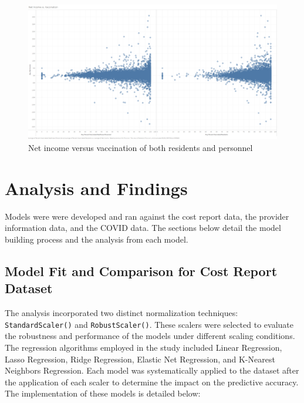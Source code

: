 \documentclass{article}
\theoremstyle{mytheoremstyle}
\theoremstyle{mytheoremstyle}
\theoremstyle{myproblemstyle}
\begin{document}
\begin{figure}[htbp]
\centering
\includegraphics[width=\linewidth]{Images/Net Income vs. Vaccination.png}
\caption{Net income versus vaccination of both residents and personnel}
\label{fig:net income vs vacc}
\end{figure}

\pagebreak

\section{Analysis and Findings}

Models were were developed and ran against the cost report data, the provider information data, and the COVID data. The sections below detail the model building process and the analysis from each model.

\subsection{Model Fit and Comparison for Cost Report Dataset}
The analysis incorporated two distinct normalization techniques: \texttt{StandardScaler()} and \texttt{RobustScaler()}. These scalers were selected to evaluate the robustness and performance of the models under different scaling conditions. The regression algorithms employed in the study included Linear Regression, Lasso Regression, Ridge Regression, Elastic Net Regression, and K-Nearest Neighbors Regression. Each model was systematically applied to the dataset after the application of each scaler to determine the impact on the predictive accuracy. The implementation of these models is detailed below:
\end{document}
